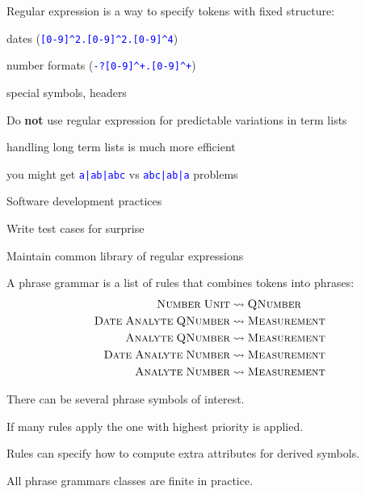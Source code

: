 \documentclass[landscape,footrule]{foils}
\begin{document}

\renewcommand{\verb}{\collectverb{\color{red}}}
Regular expression is a way to specify tokens with fixed structure:
\begin{triangles}
\item dates (\textcolor{blue}{\texttt{[0-9]\^{}2.[0-9]\^{}2.[0-9]\^{}4}}) 
\item number formats (\textcolor{blue}{\texttt{-?[0-9]\^{}+.[0-9]\^{}+}}) 
\item special symbols, headers
\end{triangles} \vspace*{3ex}

Do \textbf{not} use regular expression for predictable variations in term lists
\begin{triangles}
\item handling long term lists is much more efficient  
\item you might get \textcolor{blue}{\texttt{a|ab|abc}} vs \textcolor{blue}{\texttt{abc|ab|a}} problems
\end{triangles} \vspace*{3ex}

Software development practices
\begin{triangles}
\item Write test cases for surprise 
\item Maintain common library of regular expressions    
\end{triangles}   



A phrase grammar is a list of rules that combines tokens into phrases:
\begin{align*}
\textsc{Number}\; \textsc{Unit} &\leadsto \textsc{QNumber}\\
\textsc{Date}\;\textsc{Analyte}\; \textsc{QNumber} &\leadsto \textsc{Measurement}\\
\textsc{Analyte}\; \textsc{QNumber} &\leadsto \textsc{Measurement}\\
\textsc{Date}\; \textsc{Analyte}\; \textsc{Number} &\leadsto \textsc{Measurement}\\
\textsc{Analyte}\; \textsc{Number} &\leadsto \textsc{Measurement}
\end{align*} 

\begin{triangles}
\item There can be several phrase symbols of interest.
\item If many rules apply the one with highest priority is applied. 
\item Rules can specify how to compute extra attributes for derived symbols. 
\item All phrase grammars classes are finite in practice. 
\end{triangles}
\end{document}
